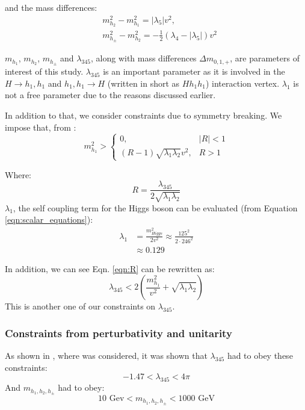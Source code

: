 \documentclass[12pt]{article}
\begin{document}
and the mass differences: 
\begin{align}
    &m_{h_2}^2 - m_{h_1}^2 =  |\lambda_5|v^2, \\
    &m_{h_\pm}^2 - m_{h_2}^2 = -\frac{1}{2}(\lambda_4 - |\lambda_5|)v^2
\end{align}

$m_{h_1}$, $m_{h_2}$, $m_{h_\pm}$ and $\lambda_{345}$, along with mass differences $\Delta m_{0, 1, +}$, are parameters of interest of this study. $\lambda_{345}$ is an important parameter as it is involved in the $H\rightarrow h_1,h_1$ and $h_1,h_1 \rightarrow H$ (written in short as $Hh_1h_1$) interaction vertex. $\lambda_1$ is not a free parameter due to the reasons discussed earlier.

In addition to that, we consider constraints due to symmetry breaking. We impose that, from \cite{Belyaev:2016lok, Ginzburg2010}:
\begin{equation}
    m_{h_1}^2 >
        \begin{cases}
         0, & |R| < 1\\
         (R-1) \sqrt{\lambda_1\lambda_2} v^2, & R>1
        \end{cases}
        \label{eqn:R}
\end{equation}

Where:
\begin{equation}
    R = \frac{\lambda_{345}}{2\sqrt{\lambda_1\lambda_2}}
\end{equation}
$\lambda_1$, the self coupling term for the Higgs boson can be evaluated (from Equation \ref{eqn:scalar_equations}):
\begin{equation}
    \begin{split}
        \lambda_1 &= \frac{m^2_{Higgs}}{2 v^2}
                \approx\frac{125^2}{2\cdot 246 ^ 2} \\
                &\approx0.129
    \end{split}
\end{equation}

In addition, we can see Eqn. \ref{eqn:R} can be rewritten as:
\begin{equation}
    \lambda_{345} < 2\left( \frac{m_{h_1}^2}{v^2} + \sqrt{\lambda_1\lambda_2}\right)
\end{equation}
This is another one of our constraints on $\lambda_{345}$.

\subsubsection{Constraints from perturbativity and unitarity}
As shown in \cite{Belyaev:2016lok}, where \cite{Aruhrib2012Inert} was considered, it was shown that $\lambda_{345}$ had to obey these constraints:
\begin{equation}
    -1.47 < \lambda_{345} < 4\pi
    \label{eqn:l345_pert}
\end{equation}
And $m_{h_1, h_2, h_\pm}$ had to obey:
\begin{equation}
    10\text{ Gev} < m_{h_1, h_2, h_\pm} < 1000\text{ GeV}
    \label{eqn:masses_pert}
\end{equation}
\end{document}
